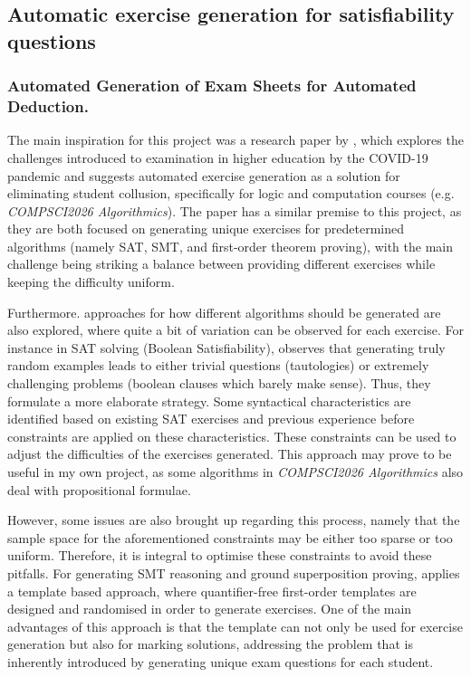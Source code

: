 \documentclass{l4proj}
\begin{document}
\subsection{Automatic exercise generation for satisfiability questions}
\subsubsection{Automated Generation of Exam Sheets for Automated Deduction.}

The main inspiration for this project was a research paper by \citet{Hoz21}, which explores the challenges introduced to examination in higher education by the COVID-19 pandemic and suggests  automated exercise generation as a solution for eliminating student collusion, specifically for logic and computation courses (e.g. \emph{COMPSCI2026 Algorithmics}). The paper has a similar premise to this project, as they are both focused on generating unique exercises for predetermined algorithms (namely SAT, SMT, and first-order theorem proving), with the main challenge being striking a balance between providing different exercises while keeping the difficulty uniform. 

Furthermore. approaches for how different algorithms should be generated are also explored, where quite a bit of variation can be observed for each exercise. For instance in SAT solving (Boolean Satisfiability), \citet{Hoz21} observes that generating truly random examples leads to either trivial questions (tautologies) or extremely challenging problems (boolean clauses which barely make sense). Thus, they formulate a more elaborate strategy. Some syntactical characteristics are identified based on existing SAT exercises and previous experience before constraints are applied on these characteristics. These constraints can be used to adjust the difficulties of the exercises generated. This approach may prove to be useful in my own project, as some algorithms in \emph{COMPSCI2026 Algorithmics} also deal with propositional formulae. 

However, some issues are also brought up regarding this process, namely that the sample space for the aforementioned constraints may be either too sparse or too uniform. Therefore, it is integral to optimise these constraints to avoid these pitfalls. For generating SMT reasoning and ground superposition proving, \citet{Hoz21} applies a template based approach, where quantifier-free first-order templates are designed and randomised in order to generate exercises. One of the main advantages of this approach is that the template can not only be used for exercise generation but also for marking solutions, addressing the problem that is inherently introduced by generating unique exam questions for each student. 
\end{document}

